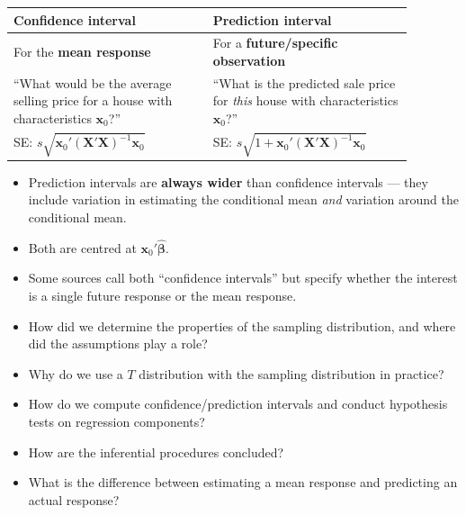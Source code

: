 \begin{center}
    \begin{tabular}{p{0.44\linewidth}p{0.44\linewidth}}
        \toprule
        \textbf{Confidence interval} & \textbf{Prediction interval} \\
        \midrule
        For the \textbf{mean response} & For a \textbf{future/specific observation} \\[2pt]
        ``What would be the average selling price for a house with characteristics $\mathbf{x}_0$?''
        & ``What is the predicted sale price for \emph{this} house with characteristics $\mathbf{x}_0$?'' \\[2pt]
        SE: $s\sqrt{\mathbf{x}_0'(\mathbf{X}'\mathbf{X})^{-1}\mathbf{x}_0}$
        & SE: $s\sqrt{1+\mathbf{x}_0'(\mathbf{X}'\mathbf{X})^{-1}\mathbf{x}_0}$ \\
        \bottomrule
    \end{tabular}
\end{center}
\begin{itemize}
    \item Prediction intervals are \textbf{always wider} than confidence intervals
     --- they include variation in
    estimating the conditional mean \emph{and} variation around the conditional mean.
    \item Both are centred at $\mathbf{x}_0'\hat{\boldsymbol\beta}$.
    \item Some sources call both ``confidence intervals'' but specify whether the
    interest is a single future response or the mean response.
\end{itemize}

\begin{remark}
    \begin{itemize}
        \item How did we determine the properties of the sampling distribution, and where
        did the assumptions play a role?
        \item Why do we use a $T$ distribution with the sampling distribution in practice?
        \item How do we compute confidence/prediction intervals and conduct hypothesis
        tests on regression components?
        \item How are the inferential procedures concluded?
        \item What is the difference between estimating a mean response and predicting an
        actual response?
    \end{itemize}
\end{remark}
